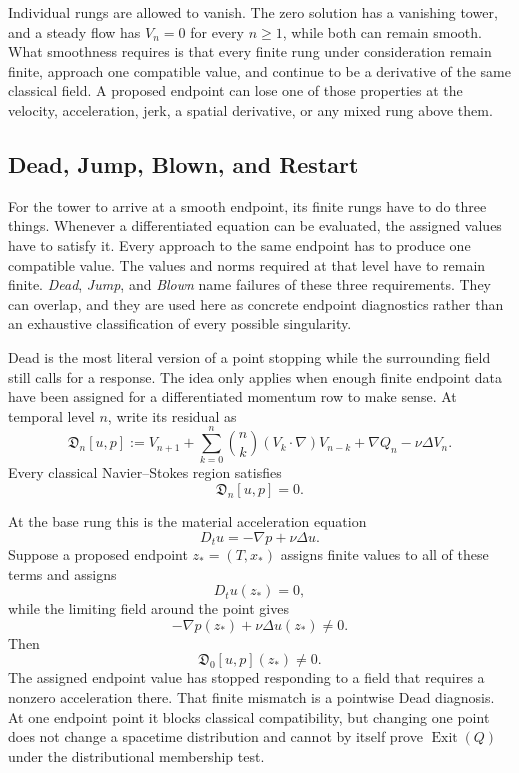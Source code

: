 Individual rungs are allowed to vanish.
The zero solution has a vanishing tower, and a steady flow has \(V_n=0\) for every \(n\geq1\), while both can remain smooth.
What smoothness requires is that every finite rung under consideration remain finite, approach one compatible value, and continue to be a derivative of the same classical field.
A proposed endpoint can lose one of those properties at the velocity, acceleration, jerk, a spatial derivative, or any mixed rung above them.

\subsection{Dead, Jump, Blown, and Restart}\label{sub:DeadJumpBlownAndRestart}

For the tower to arrive at a smooth endpoint, its finite rungs have to do three things.
Whenever a differentiated equation can be evaluated, the assigned values have to satisfy it.
Every approach to the same endpoint has to produce one compatible value.
The values and norms required at that level have to remain finite.
\emph{Dead}, \emph{Jump}, and \emph{Blown} name failures of these three requirements.
They can overlap, and they are used here as concrete endpoint diagnostics rather than an exhaustive classification of every possible singularity.


Dead is the most literal version of a point stopping while the surrounding field still calls for a response.
The idea only applies when enough finite endpoint data have been assigned for a differentiated momentum row to make sense.
At temporal level \(n\), write its residual as
\[
  \mathfrak D_n[u,p]
  :=
  V_{n+1}
  +
  \sum_{k=0}^{n}
  \binom{n}{k}
  (V_k\cdot\nabla)V_{n-k}
  +
  \nabla Q_n
  -
  \nu\Delta V_n.
\]
Every classical Navier--Stokes region satisfies
\[
  \mathfrak D_n[u,p]=0.
\]

At the base rung this is the material acceleration equation
\[
  D_tu=-\nabla p+\nu\Delta u.
\]
Suppose a proposed endpoint \(z_*=(T,x_*)\) assigns finite values to all of these terms and assigns
\[
  D_tu(z_*)=0,
\]
while the limiting field around the point gives
\[
  -\nabla p(z_*)+\nu\Delta u(z_*)\neq0.
\]
Then
\[
  \mathfrak D_0[u,p](z_*)\neq0.
\]
The assigned endpoint value has stopped responding to a field that requires a nonzero acceleration there.
That finite mismatch is a pointwise Dead diagnosis.
At one endpoint point it blocks classical compatibility, but changing one point does not change a spacetime distribution and cannot by itself prove \(\operatorname{Exit}(Q)\) under the distributional membership test.

